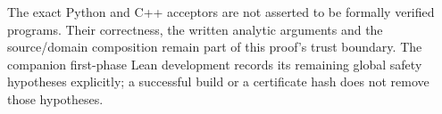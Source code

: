 \documentclass[11pt,reqno]{amsart}
\theoremstyle{definition}
\theoremstyle{remark}
\begin{document}
The exact Python and C++ acceptors are not asserted to be formally
verified programs. Their correctness, the written analytic arguments
and the source/domain composition remain part of this proof's trust
boundary. The companion first-phase Lean development records its
remaining global safety hypotheses explicitly; a successful build or
a certificate hash does not remove those hypotheses.




\end{document}
